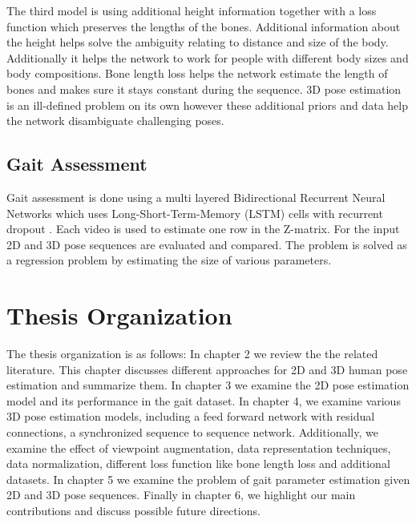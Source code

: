 The third model is using additional height information together with a loss function which preserves the lengths of the bones. Additional information about the height helps solve the ambiguity relating to distance and size of the body. Additionally it helps the network to work for people with different body sizes and body compositions. Bone length loss helps the network estimate the length of bones and makes sure it stays constant during the sequence. 3D pose estimation is an ill-defined problem on its own however these additional priors and data help the network disambiguate challenging poses.

\subsection{Gait Assessment}

Gait assessment is done using a multi layered Bidirectional Recurrent Neural Networks \parencite{schuster1997bidirectional} which uses Long-Short-Term-Memory (LSTM) \parencite{hochreiter1997long} cells with recurrent dropout \parencite{semeniuta2016recurrent}. Each video is used to estimate one row in the Z-matrix. For the input 2D and 3D pose sequences are evaluated and compared. The problem is solved as a regression problem by estimating the size of various parameters.

\section{Thesis Organization}

The thesis organization is as follows: In chapter 2 we review the the related literature. This chapter discusses different approaches for 2D and 3D human pose estimation and summarize them. In chapter 3 we examine the 2D pose estimation model and its performance in the gait dataset. In chapter 4, we examine various 3D pose estimation models, including a feed forward network with residual connections, a synchronized sequence to sequence network. Additionally, we examine the effect of viewpoint augmentation, data representation techniques, data normalization, different loss function like bone length loss and additional datasets. In chapter 5 we examine the problem of gait parameter estimation given 2D and 3D pose sequences. Finally in chapter 6, we highlight our main contributions and discuss possible future directions. 